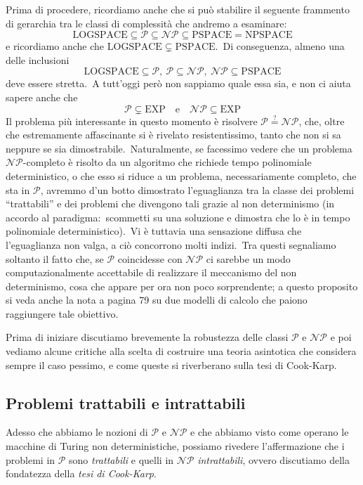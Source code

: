 \medskip
\noindent Prima di procedere, ricordiamo anche che si può stabilire il seguente frammento di gerarchia tra le classi di complessità che andremo a esaminare:
\[\mathrm{LOGSPACE} \subseteq \mathcal{P} \subseteq \mathcal{NP} \subseteq \mathrm{PSPACE} = \mathrm{NPSPACE}\]
e ricordiamo anche che $\mathrm{LOGSPACE} \subsetneq \mathrm{PSPACE}$.\
Di conseguenza, almeno una delle inclusioni
\[\mathrm{LOGSPACE} \subseteq \mathcal{P},\ \mathcal{P} \subseteq \mathcal{NP},\ \mathcal{NP} \subseteq \mathrm{PSPACE}\]
deve essere stretta.\
A tutt'oggi però non sappiamo quale essa sia, e non ci aiuta sapere anche che
\[\mathcal{P} \subsetneq \mathrm{EXP}\quad \mathrm{e} \quad \mathcal{NP} \subseteq \mathrm{EXP}\]
Il problema più interessante in questo momento è risolvere $\mathcal{P} \stackrel{?}{=} \mathcal{NP}$, che, oltre che estremamente affascinante si è rivelato resistentissimo, tanto che non si sa neppure se sia dimostrabile.\
Naturalmente, se facessimo vedere che un problema $\mathcal{NP}$-completo è risolto da un algoritmo che richiede tempo polinomiale deterministico, o che esso si riduce a un problema, necessariamente completo, che sta in $\mathcal{P}$, avremmo d'un botto dimostrato l'eguaglianza tra la classe dei problemi ``trattabili'' e dei problemi che divengono tali grazie al non determinismo (in accordo al paradigma:\ scommetti su una soluzione e dimostra che lo è in tempo polinomiale deterministico).\
Vi è tuttavia una sensazione diffusa che l'eguaglianza non valga, a ciò concorrono molti indizi.\
Tra questi segnaliamo soltanto il fatto che, se $\mathcal{P}$ coincidesse con $\mathcal{NP}$ ci sarebbe un modo computazionalmente accettabile di realizzare il meccanismo del non determinismo, cosa che appare per ora non poco sorprendente; a questo proposito si veda anche la nota a pagina 79 su due modelli di calcolo che paiono raggiungere tale obiettivo.\

Prima di iniziare discutiamo brevemente la robustezza delle classi $\mathcal{P}$ e $\mathcal{NP}$ e poi vediamo alcune critiche alla scelta di costruire una teoria asintotica che considera sempre il caso pessimo, e come queste si riverberano sulla tesi di Cook-Karp.\

\subsection{Problemi trattabili e intrattabili}

Adesso che abbiamo le nozioni di $\mathcal{P}$ e $\mathcal{NP}$ e che abbiamo visto come operano le macchine di Turing non deterministiche, possiamo rivedere l'affermazione che i problemi in $\mathcal{P}$ sono \textit{trattabili} e quelli in $\mathcal{NP}$ \textit{intrattabili}, ovvero discutiamo della fondatezza della \textit{tesi di Cook-Karp}.


